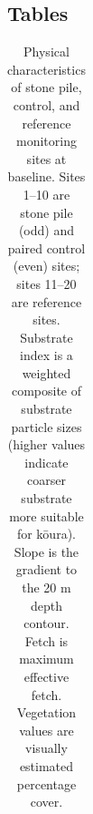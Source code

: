 \documentclass[
  letterpaper,
  DIV=11,
  numbers=noendperiod]{scrartcl}
\begin{document}
\subsection{Tables}\label{tables}

\begingroup\fontsize{8}{10}\selectfont

\begin{longtable}[t]{rllrrrrrr}

\caption{\label{tbl-site-overview}Physical characteristics of stone
pile, control, and reference monitoring sites at baseline. Sites 1--10
are stone pile (odd) and paired control (even) sites; sites 11--20 are
reference sites. Substrate index is a weighted composite of substrate
particle sizes (higher values indicate coarser substrate more suitable
for kōura). Slope is the gradient to the 20 m depth contour. Fetch is
maximum effective fetch. Vegetation values are visually estimated
percentage cover.}

\tabularnewline


\end{longtable}
\end{document}

